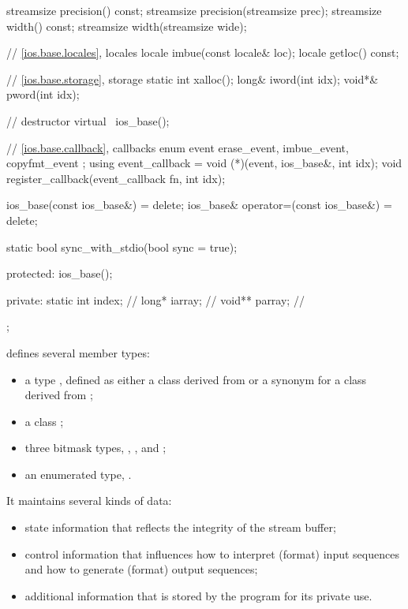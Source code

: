 \begin{codeblock}
{{    streamsize precision() const;
    streamsize precision(streamsize prec);
    streamsize width() const;
    streamsize width(streamsize wide);

    // \ref{ios.base.locales}, locales
    locale imbue(const locale& loc);
    locale getloc() const;

    // \ref{ios.base.storage}, storage
    static int xalloc();
    long&  iword(int idx);
    void*& pword(int idx);

    // destructor
    virtual ~ios_base();

    // \ref{ios.base.callback}, callbacks
    enum event { erase_event, imbue_event, copyfmt_event };
    using event_callback = void (*)(event, ios_base&, int idx);
    void register_callback(event_callback fn, int idx);

    ios_base(const ios_base&) = delete;
    ios_base& operator=(const ios_base&) = delete;

    static bool sync_with_stdio(bool sync = true);

  protected:
    ios_base();

  private:
    static int index;  // \expos
    long*  iarray;     // \expos
    void** parray;     // \expos
  };
}
\end{codeblock}

\pnum
{}
defines several member types:
\begin{itemize}
\item a type , defined as either a class derived from
 or a synonym for a class derived from ;

\item a class ;

\item three bitmask types, , , and ;

\item an enumerated type, .
\end{itemize}

\pnum
It maintains several kinds of data:
\begin{itemize}
\item
state information that reflects the integrity of the stream buffer;
\item
control information that influences how to interpret (format) input
sequences and how to generate (format) output sequences;
\item
additional information that is stored by the program for its private use.
\end{itemize}

